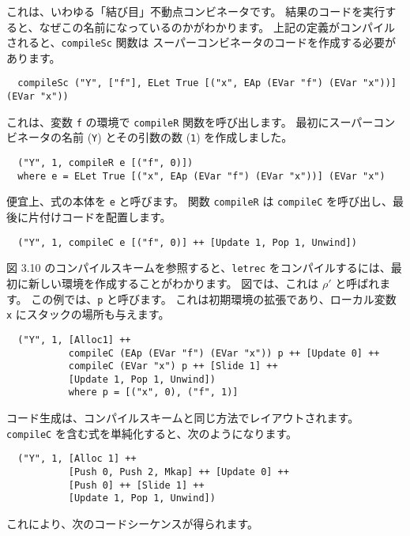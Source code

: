 \documentclass{jarticle}
\begin{document}
これは、いわゆる「結び目」不動点コンビネータです。 結果のコードを実行すると、なぜこの名前になっているのかがわかります。
上記の定義がコンパイルされると、\texttt{compileSc} 関数は
スーパーコンビネータのコードを作成する必要があります。

\begin{verbatim}
  compileSc ("Y", ["f"], ELet True [("x", EAp (EVar "f") (EVar "x"))] (EVar "x"))
\end{verbatim}

これは、変数 \texttt{f} の環境で \texttt{compileR} 関数を呼び出します。
最初にスーパーコンビネータの名前 (\texttt{Y}) とその引数の数 (\texttt{1}) を作成しました。

\begin{verbatim}
  ("Y", 1, compileR e [("f", 0)])
  where e = ELet True [("x", EAp (EVar "f") (EVar "x"))] (EVar "x")
\end{verbatim}

便宜上、式の本体を \texttt{e} と呼びます。
関数 \texttt{compileR} は \texttt{compileC} を呼び出し、最後に片付けコードを配置します。

\begin{verbatim}
  ("Y", 1, compileC e [("f", 0)] ++ [Update 1, Pop 1, Unwind])
\end{verbatim}

図 3.10 のコンパイルスキームを参照すると、\texttt{letrec} をコンパイルするには、最初に新しい環境を作成することがわかります。
図では、これは $\rho'$ と呼ばれます。 この例では、\texttt{p} と呼びます。
これは初期環境の拡張であり、ローカル変数 \texttt{x} にスタックの場所も与えます。

\begin{verbatim}
  ("Y", 1, [Alloc1] ++
           compileC (EAp (EVar "f") (EVar "x")) p ++ [Update 0] ++
           compileC (EVar "x") p ++ [Slide 1] ++
           [Update 1, Pop 1, Unwind])
           where p = [("x", 0), ("f", 1)]
\end{verbatim}

コード生成は、コンパイルスキームと同じ方法でレイアウトされます。
\texttt{compileC} を含む式を単純化すると、次のようになります。

\begin{verbatim}
  ("Y", 1, [Alloc 1] ++
           [Push 0, Push 2, Mkap] ++ [Update 0] ++
           [Push 0] ++ [Slide 1] ++
           [Update 1, Pop 1, Unwind])
\end{verbatim}

これにより、次のコードシーケンスが得られます。
\end{document}
